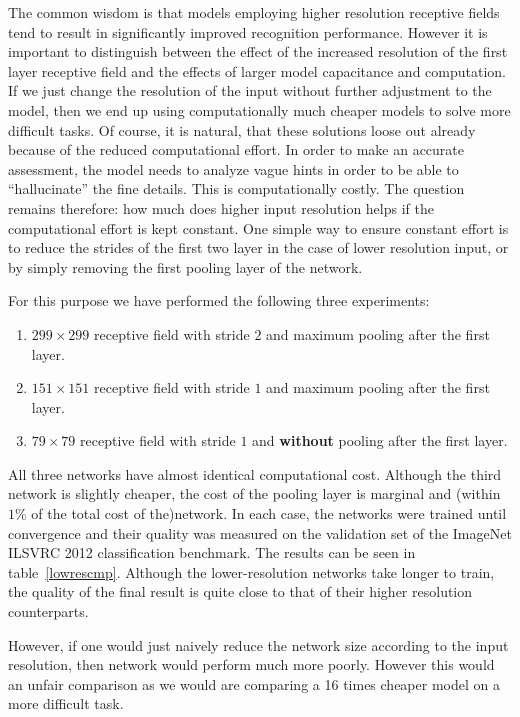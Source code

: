 \documentclass[10pt,twocolumn,letterpaper]{article}
\begin{document}
The common wisdom is that models employing higher resolution receptive
fields tend to result in significantly improved recognition performance.
However it is important to distinguish between the effect of the
increased resolution of the first layer receptive field and the
effects of larger model capacitance and computation.
If we just change the resolution of the input without further
adjustment to the model, then we end up using computationally much
cheaper models to solve more difficult tasks.
Of course, it is natural, that these solutions loose out already because of the
reduced computational effort. In order to make an accurate assessment,
the model needs to analyze vague hints in order to be able to
``hallucinate'' the fine details.
This is computationally costly. The question remains therefore: how
much does higher input resolution helps if the computational effort is
kept constant. One simple way to ensure constant effort is
to reduce the strides of the first two layer in the case of
lower resolution input, or by simply removing the first pooling layer of
the network.

For this purpose we have performed the following three experiments:
\begin{enumerate}
  \item $299\times 299$ receptive field with stride $2$ and maximum pooling
        after the first layer.
  \item $151\times 151$ receptive field with stride $1$ and maximum pooling
        after the first layer.
  \item $79\times 79$ receptive field with stride $1$ and {\bf without}
        pooling after the first layer.
\end{enumerate}
All three networks have almost identical computational cost. Although the third
network is slightly cheaper, the cost of the pooling layer is marginal
and (within $1\%$ of the total cost of the)network.
In each case, the networks were trained until convergence and their
quality was measured on the validation set of the ImageNet ILSVRC 2012
classification benchmark. The results can be seen in table~\ref{lowrescmp}.
Although the lower-resolution networks take longer to train,
the quality of the final result is quite close to that of their
higher resolution counterparts.

However, if one would just naively reduce the network size according to the
input resolution, then network would perform much more poorly. However this
would an unfair comparison as we would are comparing a 16 times cheaper model on
a more difficult task.
\end{document}
